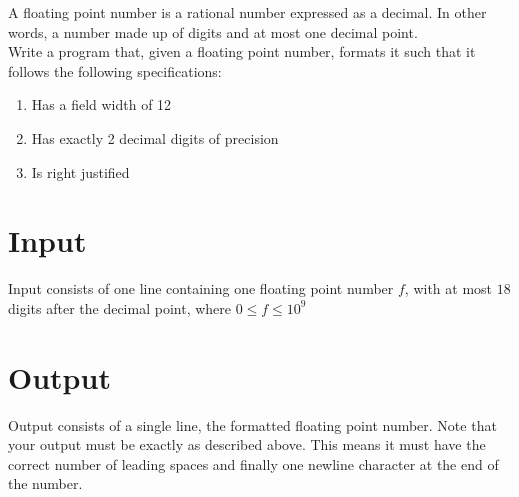 
A floating point number is a rational number expressed as a decimal. In other words, a number made up of digits and at most one decimal point. \\
Write a program that, given a floating point number, formats it such that it follows the following specifications:

\begin{enumerate}
	\item Has a field width of 12
	\item Has exactly 2 decimal digits of precision
	\item Is right justified
\end{enumerate}

\section*{Input}
Input consists of one line containing one floating point number $f$, with at most $18$ digits after the decimal point, where $0 \leq f \leq 10^9$ \\

\section*{Output}
Output consists of a single line, the formatted floating point number.
Note that your output must be exactly as described above.
This means it must have the correct number of leading spaces and finally one newline character at the end of the number.
